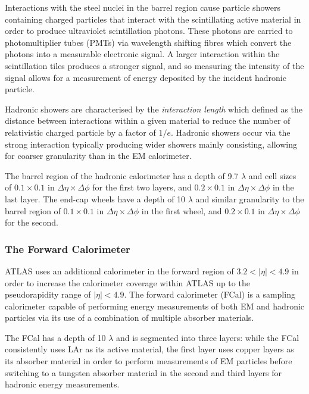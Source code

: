 \documentclass[12pt,a4paper,epsf,portrait,times,epsfig]{report}
\begin{document}
		Interactions with the steel nuclei in the barrel region cause particle showers containing charged particles that interact with the scintillating active material in order to produce ultraviolet scintillation photons. These photons are carried to photomultiplier tubes (PMTs) via wavelength shifting fibres which convert the photons into a measurable electronic signal. A larger interaction within the scintillation tiles produces a stronger signal, and so measuring the intensity of the signal allows for a measurement of energy deposited by the incident hadronic particle. \par

		Hadronic showers are characterised by the \textit{interaction length} which defined as the distance between interactions within a given material to reduce the number of relativistic charged particle by a factor of $1/e$. Hadronic showers occur via the strong interaction typically producing wider showers mainly consisting, allowing for coarser granularity than in the EM calorimeter. \par

		The barrel region of the hadronic calorimeter has a depth of 9.7 $\lambda$ and cell sizes of $0.1 \times 0.1$ in $\Delta\eta \times \Delta\phi$ for the first two layers, and $0.2 \times 0.1$ in $\Delta\eta \times \Delta\phi$ in the last layer. The end-cap wheels have a depth of 10 $\lambda$ and similar granularity to the barrel region of  $0.1 \times 0.1$ in $\Delta\eta \times \Delta\phi$ in the first wheel, and $0.2 \times 0.1$ in $\Delta\eta \times \Delta\phi$ for the second. 

		\subsubsection{The Forward Calorimeter}\label{Section:FCal}

		ATLAS uses an additional calorimeter in the forward region of $3.2 < |\eta| < 4.9$ in order to increase the calorimeter coverage within ATLAS up to the pseudorapidity range of $|\eta| < 4.9$. The forward calorimeter (FCal) is a sampling calorimeter capable of performing energy measurements of both EM and hadronic particles via its use of a combination of multiple absorber materials. \par
		
		The FCal has a depth of 10 $\lambda$ and is segmented into three layers: while the FCal consistently uses LAr as its active material, the first layer uses copper layers as its absorber material in order to perform measurements of EM particles before switching to a tungsten absorber material in the second and third layers for hadronic energy measurements.  
\end{document}
